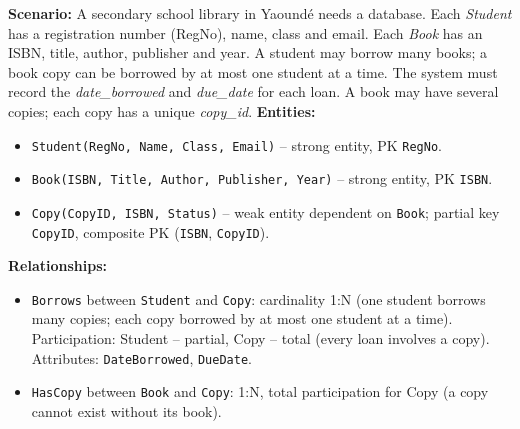 \documentclass[11pt]{article}
\begin{document}
\begin{exemplebox}
\textbf{Scenario:} A secondary school library in Yaoundé needs a database. Each \emph{Student} has a registration number (RegNo), name, class and email. Each \emph{Book} has an ISBN, title, author, publisher and year. A student may borrow many books; a book copy can be borrowed by at most one student at a time. The system must record the \emph{date\_borrowed} and \emph{due\_date} for each loan. A book may have several copies; each copy has a unique \emph{copy\_id}.
\textbf{Entities:}
\begin{itemize}
\item \texttt{Student(RegNo, Name, Class, Email)} -- strong entity, PK \texttt{RegNo}.
\item \texttt{Book(ISBN, Title, Author, Publisher, Year)} -- strong entity, PK \texttt{ISBN}.
\item \texttt{Copy(CopyID, ISBN, Status)} -- weak entity dependent on \texttt{Book}; partial key \texttt{CopyID}, composite PK (\texttt{ISBN}, \texttt{CopyID}).
\end{itemize}
\textbf{Relationships:}
\begin{itemize}
\item \texttt{Borrows} between \texttt{Student} and \texttt{Copy}: cardinality 1:N (one student borrows many copies; each copy borrowed by at most one student at a time). Participation: Student -- partial, Copy -- total (every loan involves a copy). Attributes: \texttt{DateBorrowed}, \texttt{DueDate}.
\item \texttt{HasCopy} between \texttt{Book} and \texttt{Copy}: 1:N, total participation for Copy (a copy cannot exist without its book).
\end{itemize}
\end{exemplebox}
\end{document}
